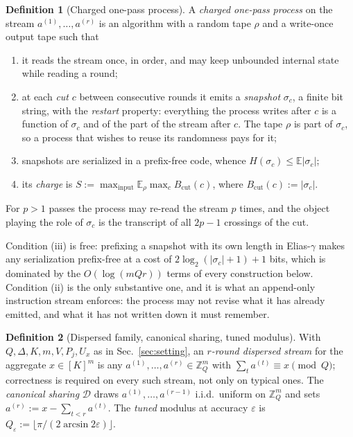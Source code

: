 \documentclass[aps,prx,twocolumn,superscriptaddress,nofootinbib,longbibliography]{revtex4-2}
\theoremstyle{plain}
\theoremstyle{definition}
\newtheorem{definition}{Definition}
\theoremstyle{remark}
\newcommand{\E}{\mathbb{E}}
\newcommand{\Z}{\mathbb{Z}}
\begin{document}
\begin{definition}[Charged one-pass process]\label{def:model}
A \emph{charged one-pass process} on the stream $a^{(1)},\dots,a^{(r)}$ is an algorithm with a random tape $\rho$ and a write-once output tape such that
\begin{enumerate}\setlength\itemsep{0pt}
\item[(i)] it reads the stream once, in order, and may keep unbounded internal state while reading a round;
\item[(ii)] at each \emph{cut} $c$ between consecutive rounds it emits a \emph{snapshot} $\sigma_c$, a finite bit string, with the \emph{restart} property: everything the process writes after $c$ is a function of $\sigma_c$ and of the part of the stream after $c$. The tape $\rho$ is part of $\sigma_c$, so a process that wishes to reuse its randomness pays for it;
\item[(iii)] snapshots are serialized in a prefix-free code, whence $H(\sigma_c)\le\E|\sigma_c|$;
\item[(iv)] its \emph{charge} is $S:=\max_{\mathrm{input}}\E_\rho\max_cB_{\mathrm{cut}}(c)$, where $B_{\mathrm{cut}}(c):=|\sigma_c|$.
\end{enumerate}
For $p>1$ passes the process may re-read the stream $p$ times, and the object playing the role of $\sigma_c$ is the transcript of all $2p-1$ crossings of the cut.
\end{definition}
Condition (iii) is free: prefixing a snapshot with its own length in Elias-$\gamma$ makes any serialization prefix-free at a cost of $2\log_2(|\sigma_c|+1)+1$ bits, which is dominated by the $O(\log(mQr))$ terms of every construction below. Condition (ii) is the only substantive one, and it is what an append-only instruction stream enforces: the process may not revise what it has already emitted, and what it has not written down it must remember.

\begin{definition}[Dispersed family, canonical sharing, tuned modulus]\label{def:family}
With $Q,\Delta,K,m,V,P_j,U_x$ as in Sec.~\ref{sec:setting}, an \emph{$r$-round dispersed stream} for the aggregate $x\in[K]^m$ is any $a^{(1)},\dots,a^{(r)}\in\Z_Q^m$ with $\sum_ta^{(t)}\equiv x\pmod Q$; correctness is required on every such stream, not only on typical ones. The \emph{canonical sharing} $\mathcal D$ draws $a^{(1)},\dots,a^{(r-1)}$ i.i.d.\ uniform on $\Z_Q^m$ and sets $a^{(r)}:=x-\sum_{t<r}a^{(t)}$. The \emph{tuned} modulus at accuracy $\varepsilon$ is $Q_\varepsilon:=\lfloor\pi/(2\arcsin2\varepsilon)\rfloor$.
\end{definition}
\end{document}
